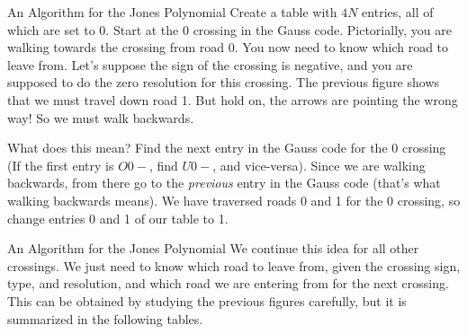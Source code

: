 \documentclass{beamer}
\begin{document}
    \begin{frame}{An Algorithm for the Jones Polynomial}
        Create a table with $4N$ entries, all of which are set to 0.
        Start at the 0 crossing in the Gauss code. Pictorially, you are walking
        towards the crossing from road 0. You now need to know which road to
        leave from. Let's suppose the sign of the crossing is negative, and
        you are supposed to do the zero resolution for this crossing. The
        previous figure shows that we must travel down road 1. But hold on,
        the arrows are pointing the wrong way! So we must walk backwards.
        \par\hfill\par
        What does this mean? Find the next entry in the Gauss code for the 0
        crossing (If the first entry is $O0-$, find $U0-$, and vice-versa).
        Since we are walking backwards, from there go to the \textit{previous}
        entry in the Gauss code (that's what walking backwards means). We have
        traversed roads 0 and 1 for the 0 crossing, so change entries 0 and 1 of
        our table to 1.
    \end{frame}
    \begin{frame}{An Algorithm for the Jones Polynomial}
        We continue this idea for all other crossings. We just need to know
        which road to leave from, given the crossing sign, type, and resolution,
        and which road we are entering from for the next crossing. This can be
        obtained by studying the previous figures carefully, but it is
        summarized in the following tables.
    \end{frame}
\end{document}
